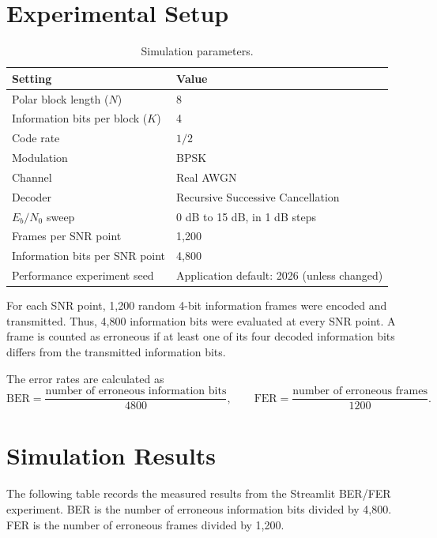 \documentclass[12pt,a4paper]{article}
\begin{document}
\section{Experimental Setup}
\begin{table}[H]
\centering
\caption{Simulation parameters.}
\label{tab:simparams}
\begin{tabularx}{0.9\linewidth}{lY}
\toprule
\textbf{Setting} & \textbf{Value}\\
\midrule
Polar block length ($N$) & 8\\
Information bits per block ($K$) & 4\\
Code rate & $1/2$\\
Modulation & BPSK\\
Channel & Real AWGN\\
Decoder & Recursive Successive Cancellation\\
$E_b/N_0$ sweep & 0 dB to 15 dB, in 1 dB steps\\
Frames per SNR point & 1,200\\
Information bits per SNR point & 4,800\\
Performance experiment seed & Application default: 2026 (unless changed)\\
\bottomrule
\end{tabularx}
\end{table}

For each SNR point, 1,200 random 4-bit information frames were encoded and transmitted. Thus, 4,800 information bits were evaluated at every SNR point. A frame is counted as erroneous if at least one of its four decoded information bits differs from the transmitted information bits.

The error rates are calculated as
\begin{equation}
  \mathrm{BER}=\frac{\text{number of erroneous information bits}}{4800},
  \qquad
  \mathrm{FER}=\frac{\text{number of erroneous frames}}{1200}.
  \label{eq:errorrates}
\end{equation}

\section{Simulation Results}
The following table records the measured results from the Streamlit BER/FER experiment. BER is the number of erroneous information bits divided by 4,800. FER is the number of erroneous frames divided by 1,200.
\end{document}
